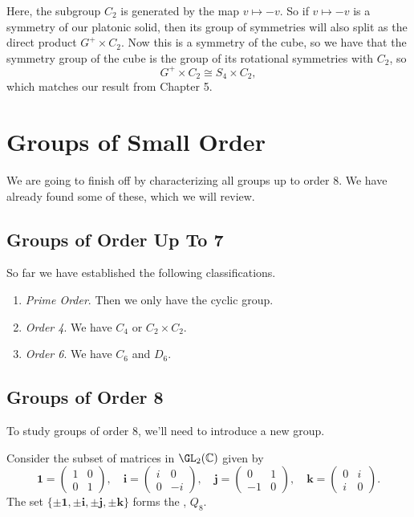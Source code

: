 \documentclass[a4paper]{scrartcl}
\begin{document}
Here, the subgroup $C_2$ is generated by the map $v \mapsto -v$. So if $v \mapsto -v$ is a symmetry of our platonic solid, then its group of symmetries will also split as the direct product $G^+ \times C_2$. Now this is a symmetry of the cube, so we have that the symmetry group of the cube is the group of its rotational symmetries with $C_2$, so
$$
G^+ \times C_2 \cong S_4 \times C_2,
$$
which matches our result from Chapter 5.





\section{Groups of Small Order}

We are going to finish off by characterizing all groups up to order 8. We have already found some of these, which we will review.

\subsection{Groups of Order Up To 7}

So far we have established the following classifications.

\begin{enumerate}
	\item \emph{Prime Order}. Then we only have the cyclic group.
	\item \emph{Order 4}. We have $C_4$ or $C_2 \times C_2$.
	\item \emph{Order 6}. We have $C_6$ and $D_6$.
\end{enumerate}

\subsection{Groups of Order 8}

To study groups of order 8, we'll need to introduce a new group.

\begin{definition}[Quaternions]
	Consider the subset of matrices in $\GL_2(\mathbb{C})$ given by
	$$
	\mathbf{1} = \begin{pmatrix}
		1 & 0 \\ 0 & 1
	\end{pmatrix}, \quad  \mathbf{i} = \begin{pmatrix}
		i & 0 \\ 0 & -i
	\end{pmatrix}, \quad \mathbf{j} = \begin{pmatrix}
		0 & 1 \\ -1 & 0
	\end{pmatrix}, \quad \mathbf{k} = \begin{pmatrix}
		0 & i \\ i & 0
	\end{pmatrix}.
	$$
	The set $\{\pm\mathbf{1}, \pm\mathbf{i}, \pm\mathbf{j}, \pm\mathbf{k}\}$ forms the , $Q_8$.
\end{definition}
\end{document}
